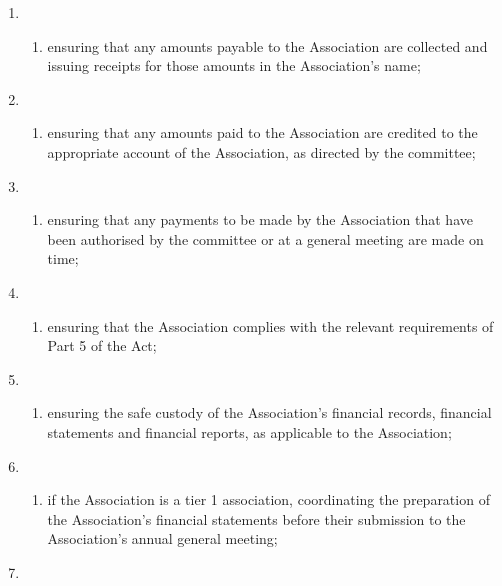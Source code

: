 \begin{enumerate}
\item \begin{enumerate}
  \def\labelenumi{\alph{enumi})}
  
  \item ensuring that any amounts payable to the Association are collected and issuing receipts for those amounts in the Association's name;
  \end{enumerate}
\item \begin{enumerate}
  \def\labelenumi{\alph{enumi})}
  \setcounter{enumi}{1}
  
  \item ensuring that any amounts paid to the Association are credited to the appropriate account of the Association, as directed by the committee;
  \end{enumerate}
\item \begin{enumerate}
  \def\labelenumi{\alph{enumi})}
  \setcounter{enumi}{2}
  
  \item ensuring that any payments to be made by the Association that have been authorised by the committee or at a general meeting are made on time;
  \end{enumerate}
\item \begin{enumerate}
  \def\labelenumi{\alph{enumi})}
  \setcounter{enumi}{3}
  
  \item ensuring that the Association complies with the relevant requirements of Part 5 of the Act;
  \end{enumerate}
\item \begin{enumerate}
  \def\labelenumi{\alph{enumi})}
  \setcounter{enumi}{4}
  
  \item ensuring the safe custody of the Association's financial records, financial statements and financial reports, as applicable to the Association;
  \end{enumerate}
\item \begin{enumerate}
  \def\labelenumi{\alph{enumi})}
  \setcounter{enumi}{5}
  
  \item if the Association is a tier 1 association, coordinating the preparation of the Association's financial statements before their submission to the Association's annual general meeting;
  \end{enumerate}
\item \begin{enumerate}
  \def\labelenumi{\alph{enumi})}
  \setcounter{enumi}{6}
  

\end{enumerate}
\end{enumerate}
